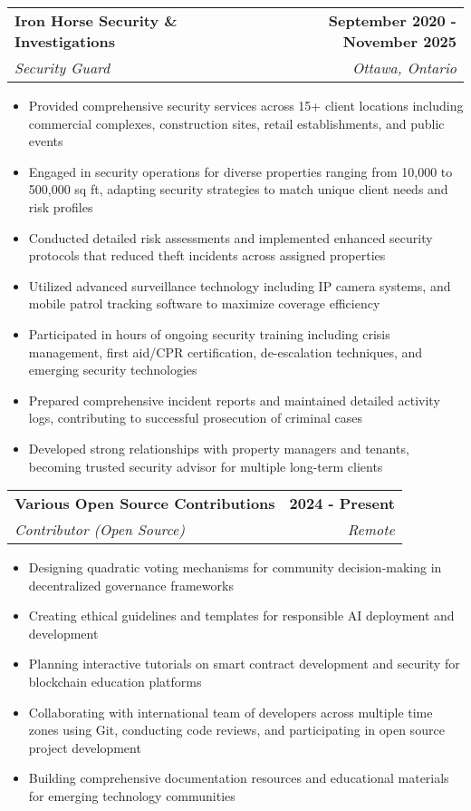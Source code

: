 \documentclass[letterpaper,11pt]{article}
\makeatletter
\newcommand{\resumeItem}[1]{
  \item\small{
    {#1 \vspace{-2pt}}
  }
}
\newcommand{\resumeSubheading}[4]{
  \vspace{-2pt}\item
    \begin{tabular*}{1.0\textwidth}[t]{l@{\extracolsep{\fill}}r}
      \textbf{#1} & \textbf{\small #2} \\
      \textit{\small#3} & \textit{\small #4} \\
    \end{tabular*}\vspace{-7pt}
}
\newcommand{\resumeItemListStart}{\begin{itemize}}
\newcommand{\resumeItemListEnd}{\end{itemize}\vspace{-5pt}}
\makeatother
\begin{document}
    \resumeSubheading
      {Iron Horse Security \& Investigations}{September 2020 - November 2025}
      {Security Guard}{Ottawa, Ontario}
      \resumeItemListStart
        \resumeItem{Provided comprehensive security services across 15+ client locations including commercial complexes, construction sites, retail establishments, and public events}
        \resumeItem{Engaged in security operations for diverse properties ranging from 10,000 to 500,000 sq ft, adapting security strategies to match unique client needs and risk profiles}
        \resumeItem{Conducted detailed risk assessments and implemented enhanced security protocols that reduced theft incidents across assigned properties}
        \resumeItem{Utilized advanced surveillance technology including IP camera systems, and mobile patrol tracking software to maximize coverage efficiency}
        \resumeItem{Participated in hours of ongoing security training including crisis management, first aid/CPR certification, de-escalation techniques, and emerging security technologies}
        \resumeItem{Prepared comprehensive incident reports and maintained detailed activity logs, contributing to successful prosecution of criminal cases}
        \resumeItem{Developed strong relationships with property managers and tenants, becoming trusted security advisor for multiple long-term clients}
    \resumeItemListEnd

    \resumeSubheading
      {Various Open Source Contributions}{2024 - Present}
      {Contributor (Open Source)}{Remote}
      \resumeItemListStart
        \resumeItem{Designing quadratic voting mechanisms for community decision-making in decentralized governance frameworks}
        \resumeItem{Creating ethical guidelines and templates for responsible AI deployment and development}
        \resumeItem{Planning interactive tutorials on smart contract development and security for blockchain education platforms}
        \resumeItem{Collaborating with international team of developers across multiple time zones using Git, conducting code reviews, and participating in open source project development}
        \resumeItem{Building comprehensive documentation resources and educational materials for emerging technology communities}
    \resumeItemListEnd
\end{document}
